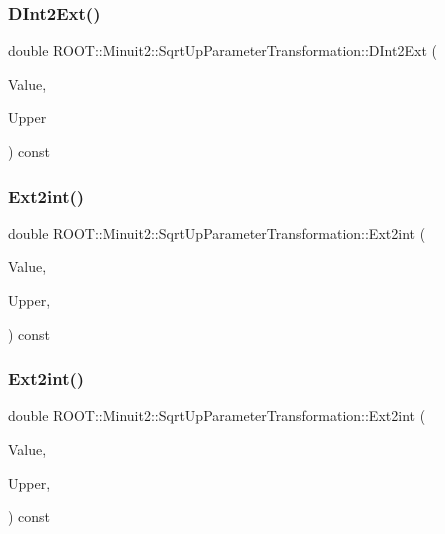 \subsubsection{\texorpdfstring{DInt2Ext()}{DInt2Ext()}\hspace{0.1cm}{\footnotesize\ttfamily [2/2]}}
{\footnotesize\ttfamily double R\+O\+O\+T\+::\+Minuit2\+::\+Sqrt\+Up\+Parameter\+Transformation\+::\+D\+Int2\+Ext (\begin{DoxyParamCaption}\item[{double}]{Value,  }\item[{double}]{Upper }\end{DoxyParamCaption}) const}

\mbox{\label{classROOT_1_1Minuit2_1_1SqrtUpParameterTransformation_a8ba129e1707b752df2b477c5e8459958}} 
\subsubsection{\texorpdfstring{Ext2int()}{Ext2int()}\hspace{0.1cm}{\footnotesize\ttfamily [1/2]}}
{\footnotesize\ttfamily double R\+O\+O\+T\+::\+Minuit2\+::\+Sqrt\+Up\+Parameter\+Transformation\+::\+Ext2int (\begin{DoxyParamCaption}\item[{double}]{Value,  }\item[{double}]{Upper,  }\item[{const \mbox{\hyperlink{classROOT_1_1Minuit2_1_1MnMachinePrecision}{Mn\+Machine\+Precision}} \&}]{ }\end{DoxyParamCaption}) const}

\mbox{\label{classROOT_1_1Minuit2_1_1SqrtUpParameterTransformation_a8ba129e1707b752df2b477c5e8459958}} 
\subsubsection{\texorpdfstring{Ext2int()}{Ext2int()}\hspace{0.1cm}{\footnotesize\ttfamily [2/2]}}
{\footnotesize\ttfamily double R\+O\+O\+T\+::\+Minuit2\+::\+Sqrt\+Up\+Parameter\+Transformation\+::\+Ext2int (\begin{DoxyParamCaption}\item[{double}]{Value,  }\item[{double}]{Upper,  }\item[{const \mbox{\hyperlink{classROOT_1_1Minuit2_1_1MnMachinePrecision}{Mn\+Machine\+Precision}} \&}]{ }\end{DoxyParamCaption}) const}

